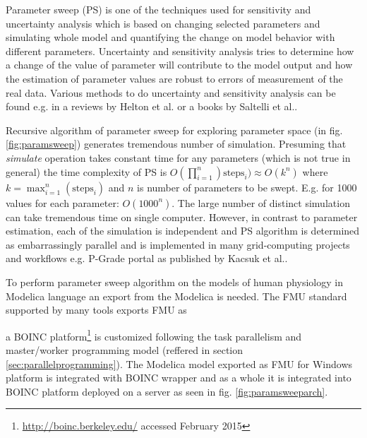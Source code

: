 Parameter sweep (PS) is one of the techniques used for sensitivity and uncertainty analysis which is based on changing selected parameters and simulating whole model and quantifying the change on model behavior with different parameters. Uncertainty and sensitivity analysis tries to determine how a change of the value of parameter will contribute to the model output and how the estimation of parameter values are robust to errors of measurement of the real data. Various methods to do uncertainty and sensitivity analysis can be found e.g. in a reviews by Helton et al. \cite{Helton2006} or a books by Saltelli et al.\cite{Saltelli2004,Saltelli2008}. 

Recursive algorithm of parameter sweep for exploring parameter space (in fig.\ref{fig:paramsweep}) generates tremendous number of simulation. Presuming that \emph{simulate} operation takes constant time for any parameters (which is not true in general) the time complexity of PS is $O(\prod_{i=1}^{n}) \text{steps}_i) \approx  O(k^n)$ where $k=\max_{i=1}^n(\text{steps}_i)$ and $n$ is number of parameters to be swept. E.g. for 1000 values for each parameter: $O(1000^n)$. The large number of distinct simulation can take tremendous time on single computer. However, in contrast to parameter estimation, each of the simulation is independent and PS algorithm is determined as embarrassingly parallel and is implemented in many grid-computing projects and workflows e.g. P-Grade portal as published by Kacsuk et al.\cite{Kacsuk2011}.

To perform parameter sweep algorithm on the models of human physiology in Modelica language an export from the Modelica is needed. The FMU standard supported by many tools exports FMU as 

a BOINC platform\cite{Anderson2004}\footnote{\url{http://boinc.berkeley.edu/} accessed February 2015} is customized following the task parallelism and master/worker programming model (reffered in section \ref{sec:parallelprogramming}). The Modelica model exported as FMU for Windows platform is integrated with BOINC wrapper and as a whole it is integrated into BOINC platform deployed on a server as seen in fig. \ref{fig:paramsweeparch}. 

